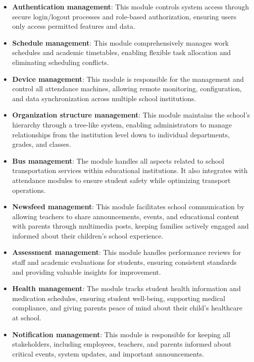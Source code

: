    \begin{itemize} [itemsep=-0.1cm, topsep=0.1cm]
        \item \textbf{Authentication management}: This module controls system access through secure login/logout processes and role-based authorization, ensuring users only access permitted features and data.
        \item \textbf{Schedule management}: This module comprehensively manages work schedules and academic timetables, enabling flexible task allocation and eliminating scheduling conflicts.
        \item \textbf{Device management}: This module is responsible for the management and control all attendance machines, allowing remote monitoring, configuration, and data synchronization across multiple school institutions.
        \item \textbf{Organization structure management}: This module maintains the school's hierarchy through a tree-like system, enabling administrators to manage relationships from the institution level down to individual departments, grades, and classes.
        \item \textbf{Bus management}: The module handles all aspects related to school transportation services within educational institutions. It also integrates with attendance modules to ensure student safety while optimizing transport operations.
        \item \textbf{Newsfeed management}: This module facilitates school communication by allowing teachers to share announcements, events, and educational content with parents through multimedia posts, keeping families actively engaged and informed about their children's school experience.
        \item \textbf{Assessment management}: This module handles performance reviews for staff and academic evaluations for students, ensuring consistent standards and providing valuable insights for improvement.
        \item \textbf{Health management}: The module tracks student health information and medication schedules, ensuring student well-being, supporting medical compliance, and giving parents peace of mind about their child's healthcare at school.
        \item \textbf{Notification management}: This module is responsible for keeping all stakeholders, including employees, teachers, and parents informed about critical events, system updates, and important announcements.
    \end{itemize}
